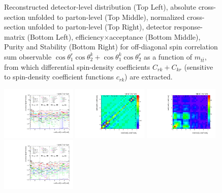 \begin{refsection}
\begin{figure}[htb]
\begin{center}
\caption{Reconstructed detector-level distribution (Top Left), absolute cross-section unfolded to parton-level (Top Middle), normalized cross-section unfolded to parton-level (Top Right), detector response-matrix (Bottom Left), efficiency$\times$acceptance (Bottom Middle), Purity and Stability (Bottom Right) for off-diagonal spin correlation sum observable $\cos\theta_{1}^{r}\cos\theta_{2}^{k}+\cos\theta_{1}^{k}\cos\theta_{2}^{r}$ as a function of $m_{t\bar{t}}$, from which differential spin-density coefficients $C_{rk}+C_{kr}$ (sensitive to spin-density coefficient functions $c_{r k}$) are extracted.}
\label{fig:c_Prk_mttbar}
\end{center}
\end{figure}
\clearpage
\begin{figure}[htb]
\begin{center}
 \includegraphics[width=0.32\textwidth]{fig_fullRun2UL/unfolding/combined/deltaSystCombinedlog_rebinnedB_c_Prk_mttbar.pdf}
 \includegraphics[width=0.32\textwidth]{fig_fullRun2UL/unfolding/combined/StatCovMatrix_rebinnedB_c_Prk_mttbar.pdf}
 \includegraphics[width=0.32\textwidth]{fig_fullRun2UL/unfolding/combined/TotalSystCovMatrix_rebinnedB_c_Prk_mttbar.pdf} \\
 \includegraphics[width=0.32\textwidth]{fig_fullRun2UL/unfolding/combined/deltaSystCombinedlogNorm_rebinnedB_c_Prk_mttbar.pdf}

\end{center}
\end{figure}
\end{refsection}
